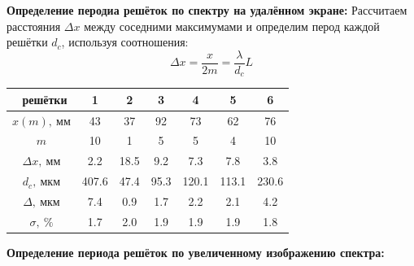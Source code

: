 \documentclass[10pt, a4paper]{article}
\begin{document}
\textbf{Определение перодиа решёток по спектру на удалённом экране:}
Рассчитаем расстояния $\Delta x$ между соседними максимумами и определим перод каждой решётки $d_c$, используя соотношения:
\[
\Delta x = \frac{x}{2 m} = \frac{\lambda}{d_c} L
\]
\begin{table}[H]
	\centering
	\begin{tabular}{|c|c|c|c|c|c|c|}  \hline
	\textnumero\ решётки & 1 & 2 & 3 & 4 & 5 & 6 \\\hline
	$x(m),\ мм$ & 43 & 37 & 92 & 73 & 62 & 76 \\\hline
	$m$ & 10 & 1 & 5 & 5 & 4 & 10 \\\hline
	$\Delta x,\ мм$ & 2.2 & 18.5 & 9.2 & 7.3 & 7.8 & 3.8 \\\hline
	$d_c,\ мкм$ & 407.6 & 47.4 & 95.3 & 120.1 & 113.1 & 230.6 \\\hline
	$\Delta,\ мкм$ & 7.4 & 0.9 & 1.7 & 2.2 & 2.1 & 4.2 \\\hline
	$\sigma,\ \%$ & 1.7 & 2.0 & 1.9 & 1.9 & 1.9 & 1.8 \\\hline
	\end{tabular}
	\end{table}
\textbf{Определение периода решёток по увеличенному изображению спектра:}
\end{document}
